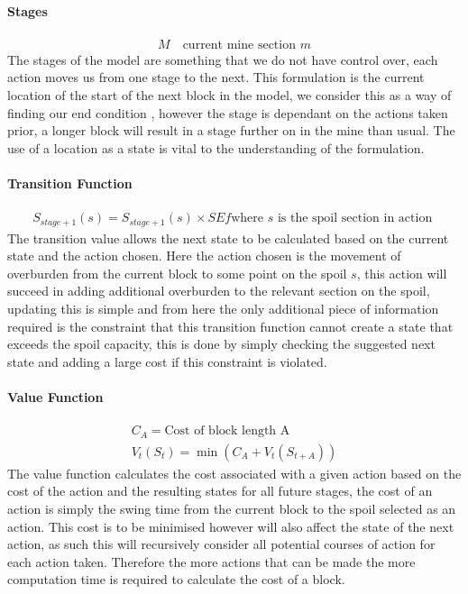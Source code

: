 \paragraph*{Stages}
\begin{align}
\label{DP:Stage0}
M \quad \text{current mine section }m 
\end{align}
The stages of the model are something that we do not have control over, each action moves us from one stage to the next. This formulation is the current location of the start of the next block in the model, we consider this as a way of finding our end condition , however the stage is dependant on the actions taken prior, a longer block will result in a stage further on in the mine than usual. The use of a location as a state is vital to the understanding of the formulation. 
\paragraph*{Transition Function}
\begin{align}
\label{Transition}
S_{stage+1}(s)=S_{stage+1}(s)\times SEf  \text{where $s$ is the spoil section in action }
\end{align}
The transition value allows the next state to be calculated based on the current state and the action chosen. Here the action chosen is the movement of overburden from the current block to some point on the spoil $s$, this action will succeed in adding additional overburden to the relevant section on the spoil, updating this is simple and from here the only additional piece of information required is the constraint that this transition function cannot create a state that exceeds the spoil capacity, this is done by simply checking the suggested next state and adding a large cost if this constraint is violated. 
\paragraph*{Value Function}
\begin{align}
\label{value}
C_A = \text{Cost of block length A}\\
V_t(S_t) = \min (C_A+V_t(S_{t+A}))
\end{align}
The value function calculates the cost associated with a given action based on the cost of the action and the resulting states for all future stages, the cost of an action is simply the swing time from the current block to the spoil selected as an action. This cost is to be minimised however will also affect the state of the next action, as such this will recursively consider all potential courses of action for each action taken. Therefore the more actions that can be made the more computation time is required to calculate the cost of a block. 
